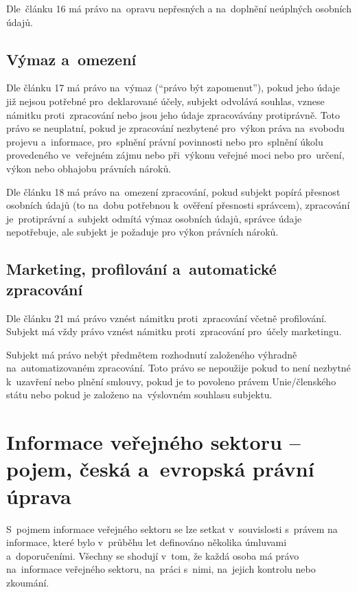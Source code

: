 Dle~článku 16 má právo na~opravu nepřesných a na~doplnění neúplných osobních údajů.

\subsection*{Výmaz a~omezení}

Dle článku 17 má právo na~výmaz (\enquote{právo být zapomenut}), pokud jeho údaje již nejsou potřebné pro~deklarované účely, subjekt odvolává souhlas, vznese námitku proti~zpracování nebo jsou jeho údaje zpracovávány protiprávně. Toto právo se neuplatní, pokud je zpracování nezbytené pro~výkon práva na~svobodu projevu a~informace, pro~splnění právní povinnosti nebo pro~splnění úkolu provedeného ve~veřejném zájmu nebo při~výkonu veřejné moci nebo pro~určení, výkon nebo obhajobu právních nároků.

Dle článku 18 má právo na~omezení zpracování, pokud subjekt popírá přesnost osobních údajů (to na~dobu potřebnou k~ověření přesnosti správcem), zpracování je~protiprávní a~subjekt odmítá výmaz osobních údajů, správce údaje nepotřebuje, ale subjekt je požaduje pro výkon právních nároků.

\subsection*{Marketing, profilování a~automatické zpracování}

Dle článku 21 má právo vznést námitku proti~zpracování včetně profilování. Subjekt má vždy právo vznést námitku proti~zpracování pro~účely marketingu.

Subjekt má právo nebýt předmětem rozhodnutí založeného výhradně na~automatizovaném zpracování. Toto právo se nepoužije pokud to není nezbytné k~uzavření nebo plnění smlouvy, pokud je to povoleno právem Unie/členského státu nebo pokud je založeno na~výslovném souhlasu subjektu.

\clearpage
\section{Informace veřejného sektoru -- pojem, česká a~evropská právní úprava}

S~pojmem informace veřejného sektoru se lze setkat v~souvislosti s~právem na informace, které bylo v~průběhu let definováno několika úmluvami a~doporučeními. Všechny se shodují v~tom, že každá osoba má právo na~informace veřejného sektoru, na~práci s~nimi, na~jejich kontrolu nebo zkoumání.

